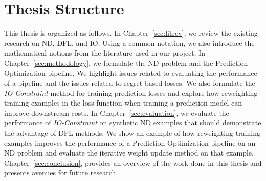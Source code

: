 \section{Thesis Structure}

This thesis is organized as follows. In Chapter~\ref{sec:litrev}, we review the existing research on ND, DFL, and IO. Using a common notation, we also introduce the mathematical notions from the literature used in our project. In Chapter~\ref{sec:methodology}, we formulate the ND problem and the Prediction-Optimization pipeline. We highlight issues related to evaluating the performance of a pipeline and the issues related to regret-based losses. We also formulate the \textit{IO-Constraint} method for training prediction losses and explore how reweighting training examples in the loss function when training a prediction model can improve downstream costs. In Chapter~\ref{sec:evaluation}, we evaluate the performance of \textit{IO-Constraint} on synthetic ND examples that should demonstrate the advantage of DFL methods. We show an example of how reweighting training examples improves the performance of a Prediction-Optimization pipeline on an ND problem and evaluate the iterative weight update method on that example. Chapter~\ref{sec:conclusion}, provides an overview of the work done in this thesis and presents avenues for future research.
